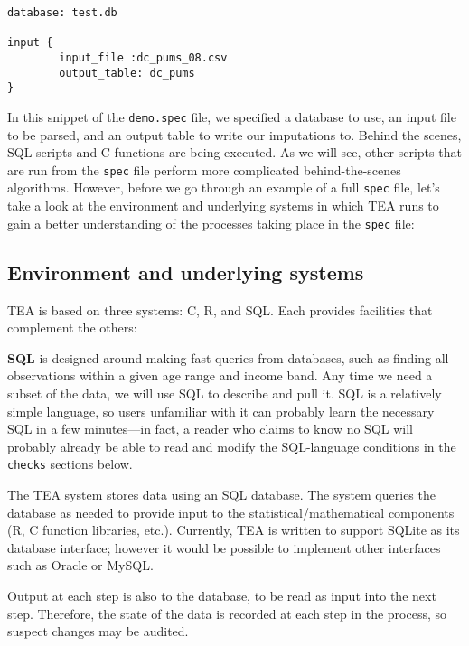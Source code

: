 \documentclass{article}
\begin{document}
\begin{specbit}
\begin{verbatim}
database: test.db

input {
        input_file :dc_pums_08.csv
        output_table: dc_pums
}
\end{verbatim}
\end{specbit} 

In this snippet of the {\tt demo.spec} file, we specified a database to use, an input 
file to be parsed, and an output table to write our imputations to. Behind the scenes, 
SQL scripts and C functions are being executed. As we will see, other scripts that are 
run from the {\tt spec} file perform more complicated behind-the-scenes algorithms. 
However, before we go through an example of a full {\tt spec} file, let's take a look at 
the environment and underlying systems in which TEA runs to gain a better understanding 
of the processes taking place in the {\tt spec} file:

\subsection{Environment and underlying systems}
TEA is based on three systems: C, R, and SQL. Each provides facilities that complement the others:

{\bf SQL} is designed around making fast queries from databases, such as finding all
observations within a given age range and income band. Any time we need a subset of the
data, we will use SQL to describe and pull it. SQL is a relatively simple language, so
users unfamiliar with it can probably learn the necessary SQL in a few
minutes---in fact, a reader who claims to know no SQL will probably already be able
to read and modify the SQL-language conditions in the {\tt checks} sections below.

The TEA system stores data using an SQL database. The system queries the database as
needed to provide input to the statistical/mathematical components (R, C function libraries, etc.).
Currently, TEA is written to support SQLite as its database interface; however it would
be possible to implement other interfaces such as Oracle or MySQL.

Output at each step is also to the database, to be read as input into the next
step. Therefore, the state of the data is recorded at each step in the process, so
suspect changes may be audited.
\end{document}
